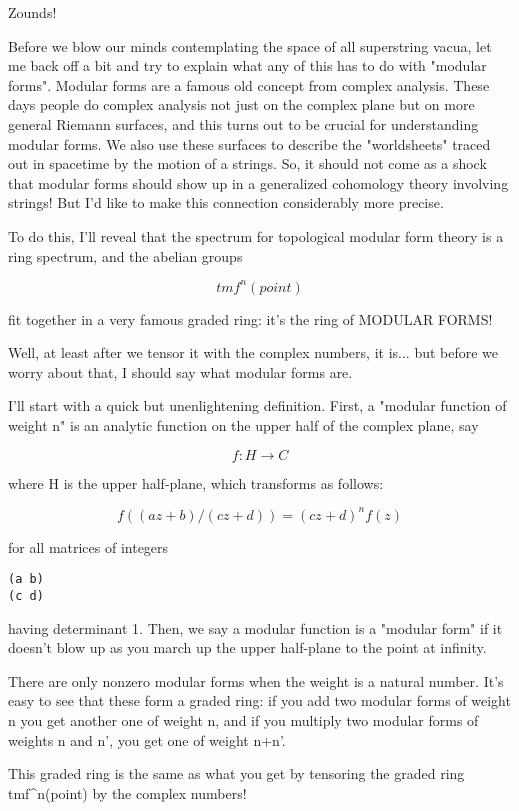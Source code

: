 Zounds!

Before we blow our minds contemplating the space of all superstring
vacua, let me back off a bit and try to explain what any of this 
has to do with "modular forms".  Modular forms are a famous old 
concept 
from complex analysis.  These days people do complex analysis not just 
on the complex plane but on more general Riemann surfaces, and this 
turns out to be crucial for understanding modular forms.  We also use 
these surfaces to describe the "worldsheets" traced out in spacetime 
by the motion of a strings.  So, it should not come as a shock that 
modular forms should show up in a generalized cohomology theory involving 
strings!  But I'd like to make this connection considerably more precise.
  
To do this, I'll reveal that the spectrum for topological modular 
form theory is a ring spectrum, and the abelian groups

$$
tmf^{n}(point) 
$$
    
fit together in a very famous graded ring: it's the ring of 
MODULAR FORMS!  

Well, at least after we tensor it with the complex numbers,
it is... but before we worry about that, I should say what 
modular forms are.

I'll start with a quick but unenlightening definition.
First, a "modular function of weight n" is an analytic 
function on the upper half of the complex plane, say

$$
f: H \to  C                      
$$
    
where H is the upper half-plane, which transforms as follows:

$$
f((az+b)/(cz+d)) = (cz+d)^{n} f(z)
$$
    
for all matrices of integers

\begin{verbatim}
(a b) 
(c d)
\end{verbatim}
    
having determinant 1.  Then, we say a modular function is a
"modular form" if it doesn't blow up as you march up
the upper half-plane to the point at infinity.  

There are only nonzero modular forms when the weight
is a natural number.  It's easy to see that these form a
graded ring: if you add two modular forms of weight n 
you get another one of weight n, and if you multiply two
modular forms of weights n and n', you get one of weight n+n'. 

This graded ring is the same as what you get by tensoring the 
graded ring tmf^{n}(point) by the complex numbers!

